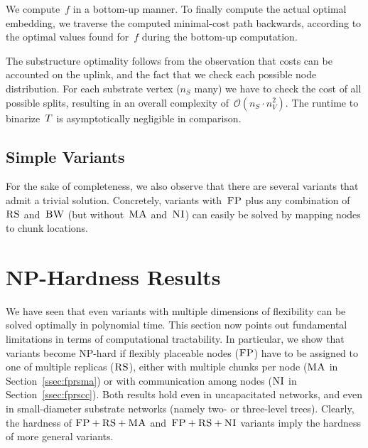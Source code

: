 We compute~$f$ in a bottom-up manner. 
To finally compute the actual optimal embedding,
we traverse the computed minimal-cost path backwards,
according to
the optimal values found for~$f$ during the bottom-up computation.


The substructure optimality follows from the observation that
costs can be accounted on the uplink, and the fact
 that we check each possible node distribution.
For each substrate vertex ($n_S$ many) we have
to check the cost of all possible splits,
resulting in an overall complexity of~$\mathcal{O}(n_S \cdot n_V^2)$.
The runtime to binarize~$T$ is asymptotically negligible in comparison.


\subsection{Simple Variants}



For the sake of completeness, we also observe that there are
several variants that admit a trivial solution. Concretely, variants with~$\textsc{FP}$
plus any combination of
$\textsc{RS}$ and~$\textsc{BW}$ (but without~$\textsc{MA}$ and~$\textsc{NI}$) can easily be solved by
mapping
nodes to chunk locations.

\section{NP-Hardness Results}\label{sec:np}

We have seen that even variants with multiple dimensions of
flexibility can be solved optimally in polynomial time.
This section now points out fundamental
limitations in terms of computational tractability.
In particular, we
show that variants become NP-hard if flexibly placeable nodes ($\textsc{FP}$) have to be assigned to one of multiple replicas ($\textsc{RS}$), either with multiple chunks per node ($\textsc{MA}$ in Section~\ref{ssec:fprsma}) or with communication among nodes ($\textsc{NI}$ in Section~\ref{ssec:fprscc}).
Both results hold even in uncapacitated networks, and even in small-diameter
substrate networks (namely two- or three-level trees).
Clearly, the hardness of $\textsc{FP}+\textsc{RS}+\textsc{MA}$ and~$\textsc{FP}+\textsc{RS}+\textsc{NI}$ variants imply
the hardness of more general variants.

